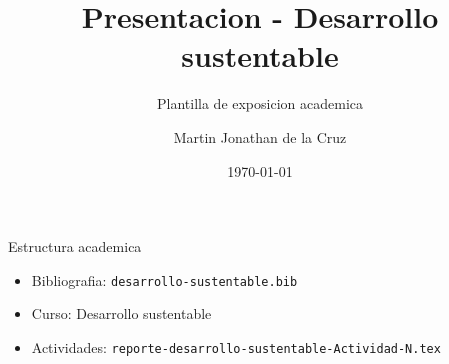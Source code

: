 \documentclass[spanish,aspectratio=169]{beamer}
\title{Presentacion - Desarrollo sustentable}
\subtitle{Plantilla de exposicion academica}
\author{Martin Jonathan de la Cruz}
\institute{Universidad Ciudadana de Nuevo Leon}
\date{\today}
\begin{document}
\begin{frame}
  \titlepage
\end{frame}

\begin{frame}{Estructura academica}
  \begin{itemize}
    \item Bibliografia: \texttt{desarrollo-sustentable.bib}
    \item Curso: Desarrollo sustentable
    \item Actividades: \texttt{reporte-desarrollo-sustentable-Actividad-N.tex}
  \end{itemize}
\end{frame}
\end{document}
